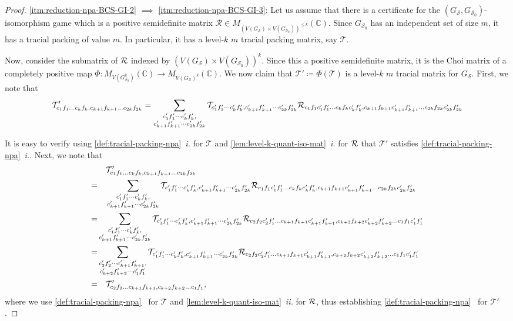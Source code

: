 \documentclass[11pt,a4paper]{article}
\theoremstyle{plain}
\theoremstyle{remark}
\theoremstyle{definition}
\def\calS{{\mathcal S}} \def\calT{{\mathcal T}} \def\calU{{\mathcal U}}
\begin{document}
\begin{proof}
    \ref{itm:reduction-npa-BCS-GI-2} $\implies$ \ref{itm:reduction-npa-BCS-GI-3}: Let us assume that there is a certificate for the $(G_\calS, G_{\calS_0})$-isomorphism game which is a positive semidefinite matrix $\mathcal{R} \in M_{(V(G_{\calS}) \times V(G_{\calS_0}))^{\leq k}}(\mathbb{C})$. Since $G_{\calS_0}$ has an independent set of size $m$, it has a tracial packing of value $m$. In particular, it has a level-$k$ $m$ tracial packing matrix, say $\calT$. 
    
    Now, consider the submatrix of ${\mathcal R}$ indexed by $(V(G_{\calS}) \times V(G_{\calS_0}))^{k}$. Since this a positive semidefinite matrix, it is the Choi matrix of a completely positive map $\Phi: M_{V(G_{\calS_0}^k)}(\mathbb{C}) \to M_{V(G_{\calS})^k}(\mathbb{C})$. We now claim that $\calT' \coloneq \Phi(\calT)$ is a level-$k$ $m$ tracial matrix for $G_{\calS}$. First, we note that 
    $$\calT'_{c_1f_1\dots c_kf_k, c_{k+1}f_{k+1} \dots c_{2k}f_{2k}} = \sum_{\substack{c_1'f_1' \cdots c_{k}'f_{k}', \\ c_{k+1}'f_{k+1}' \cdots c_{2k}'f_{2k}'}} \calT_{c_1'f_1' \cdots c_{k}'f_{k}', c_{k+1}'f_{k+1}' \cdots c_{2k}'f_{2k}'} \calR_{c_1f_1c_1'f_1' \dots c_kf_kc_k'f_k', c_{k+1}f_{k+1}c_{k+1}'f_{k+1}' \dots c_{2k}f_{2k}c_{2k}'f_{2k}'}$$

    It is easy to verify using \cref{def:tracial-packing-npa}~\textit{i.} for $\calT$ and \cref{lem:level-k-quant-iso-mat}~\textit{i.} for ${\mathcal R}$ that $\calT'$ satisfies \cref{def:tracial-packing-npa}~\textit{i.}. Next, we note that
\begin{align*}
    & \quad \calT'_{c_1f_1\dots c_kf_k, c_{k+1}f_{k+1} \dots c_{2k}f_{2k}}\\
   = & \quad \sum_{\substack{c_1'f_1' \cdots c_{k}'f_{k}', \\ c_{k+1}'f_{k+1}' \cdots c_{2k}'f_{2k}'}} \calT_{c_1'f_1' \cdots c_{k}'f_{k}', c_{k+1}'f_{k+1}' \cdots c_{2k}'f_{2k}'} \calR_{c_1f_1c_1'f_1' \dots c_kf_kc_k'f_k', c_{k+1}f_{k+1}c_{k+1}'f_{k+1}' \dots c_{2k}f_{2k}c_{2k}'f_{2k}'}\\
   = & \sum_{\substack{c_1'f_1' \cdots c_{k}'f_{k}', \\ c_{k+1}'f_{k+1}' \cdots c_{2k}'f_{2k}'}} \calT_{c_1'f_1' \cdots c_{k}'f_{k}', c_{k+1}'f_{k+1}' \cdots c_{2k}'f_{2k}'} \calR_{c_2f_2c_2'f_1' \dots c_{k+1}f_{k+1}c_{k+1}'f_{k+1}', c_{k+2}f_{k+2}c_{k+2}'f_{k+2}' \dots c_{1}f_{1}c_{1}'f_{1}'} \\
   = & \sum_{\substack{c_2'f_2' \cdots c_{k+1}'f_{k+1}', \\ c_{k+2}'f_{k+2}' \cdots c_{1}'f_{1}'}} \calT_{c_1'f_1' \cdots c_{k}'f_{k}', c_{k+1}'f_{k+1}' \cdots c_{2k}'f_{2k}'} \calR_{c_2f_2c_2'f_1' \dots c_{k+1}f_{k+1}c_{k+1}'f_{k+1}', c_{k+2}f_{k+2}c_{k+2}'f_{k+2}' \dots c_{1}f_{1}c_{1}'f_{1}'} \\
   = & \quad \calT'_{c_2f_2\dots c_{k+1}f_{k+1}, c_{k+2}f_{k+2} \dots c_{1}f_{1}}, 
\end{align*}
where we use \cref{def:tracial-packing-npa}~ for $\calT$ and \cref{lem:level-k-quant-iso-mat}~\textit{ii.} for ${\mathcal R}$, thus establishing  \cref{def:tracial-packing-npa}~ for $\calT'$. 


\end{proof}
\end{document}
